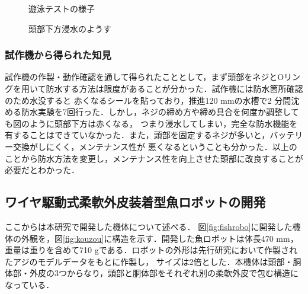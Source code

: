 \begin{figure}[t]
    \centering
    \caption{遊泳テストの様子}
    \label{fig:test_sisaku}
\end{figure}
\begin{figure}[t]
    \centering
    \caption{頭部下方浸水のようす}
    \label{fig:bousuitest_sisaku}
\end{figure}

\subsubsection{試作機から得られた知見}
試作機の作製・動作確認を通して得られたこととして，まず頭部をネジとOリングを用いて防水する方法は限度があることが分かった．試作機には防水箇所確認のため水没すると
赤くなるシールを貼っており，推進120 mmの水槽で2 分間沈める防水実験を7回行った．しかし，ネジの締め方や締め具合を何度か調整しても図のように頭部下方は赤くなる，
つまり浸水してしまい，完全な防水機能を有することはできていなかった．また，頭部を固定するネジが多いと，バッテリー交換がしにくく，メンテナンス性が
悪くなるということも分かった．以上のことから防水方法を変更し，メンテナンス性を向上させた頭部に改良することが必要だとわかった．

\subsection{ワイヤ駆動式柔軟外皮装着型魚ロボットの開発}
ここからは本研究で開発した機体について述べる．
図\ref{fig:fishrobo}に開発した機体の外観を，図\ref{fig:kouzou}に構造を示す．開発した魚ロボットは体長470 mm，重量は重りを含めて710 gである．ロボットの外形は先行研究において作製されたアジのモデルデータをもとに作製し，
サイズは2倍とした．本機体は頭部・胴体部・外皮の3つからなり，頭部と胴体部をそれぞれ別の柔軟外皮で包む構造になっている．


